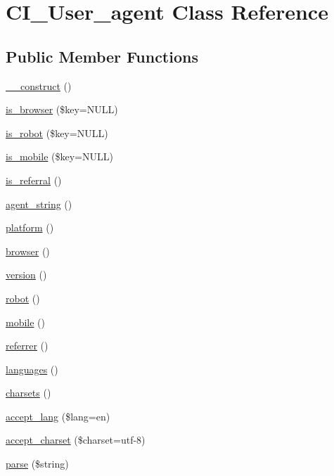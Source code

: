 \hypertarget{class_c_i___user__agent}{}\section{C\+I\+\_\+\+User\+\_\+agent Class Reference}
\label{class_c_i___user__agent}
\subsection*{Public Member Functions}
\begin{DoxyCompactItemize}
\item 
\mbox{\hyperlink{class_c_i___user__agent_a095c5d389db211932136b53f25f39685}{\+\_\+\+\_\+construct}} ()
\item 
\mbox{\hyperlink{class_c_i___user__agent_a3a0c84a9f4a781e53c7529af8a5075ae}{is\+\_\+browser}} (\$key=N\+U\+LL)
\item 
\mbox{\hyperlink{class_c_i___user__agent_aaf9eed8184635473476a24f6a850815c}{is\+\_\+robot}} (\$key=N\+U\+LL)
\item 
\mbox{\hyperlink{class_c_i___user__agent_ab0ec0b7f6a5eeaf00e35743c25e68dfe}{is\+\_\+mobile}} (\$key=N\+U\+LL)
\item 
\mbox{\hyperlink{class_c_i___user__agent_ab2ec679c069f45c4265dade1e1097f17}{is\+\_\+referral}} ()
\item 
\mbox{\hyperlink{class_c_i___user__agent_a2a75d1ec3cf3f59cdcae64f6afbc8a1b}{agent\+\_\+string}} ()
\item 
\mbox{\hyperlink{class_c_i___user__agent_ad69bddb2ba31b27415484b3da4213ba8}{platform}} ()
\item 
\mbox{\hyperlink{class_c_i___user__agent_a7dbfb19bfe0682921dcfad5de8dc987c}{browser}} ()
\item 
\mbox{\hyperlink{class_c_i___user__agent_a6080dae0886626b9a4cedb29240708b1}{version}} ()
\item 
\mbox{\hyperlink{class_c_i___user__agent_a4d6a9230d82ec6fc2fdd6bc57f4da5e5}{robot}} ()
\item 
\mbox{\hyperlink{class_c_i___user__agent_a8e13f70e084cbb413d7b68805f3b09dd}{mobile}} ()
\item 
\mbox{\hyperlink{class_c_i___user__agent_a3a7bdecfe4516d7ce790734ae1449d29}{referrer}} ()
\item 
\mbox{\hyperlink{class_c_i___user__agent_adda8fc15b6fe0efc05a50d2645189c77}{languages}} ()
\item 
\mbox{\hyperlink{class_c_i___user__agent_a1c3819a3fa2777b0b0f2c8ab5d97d833}{charsets}} ()
\item 
\mbox{\hyperlink{class_c_i___user__agent_a89add2e480d14b5f755993f4f5e0bd72}{accept\+\_\+lang}} (\$lang=\textquotesingle{}en\textquotesingle{})
\item 
\mbox{\hyperlink{class_c_i___user__agent_adc1f6218ec74ef1686ae6cb1218be7b1}{accept\+\_\+charset}} (\$charset=\textquotesingle{}utf-\/8\textquotesingle{})
\item 
\mbox{\hyperlink{class_c_i___user__agent_a8652be52c4455b8ce1a8e79fdb083703}{parse}} (\$string)
\end{DoxyCompactItemize}
